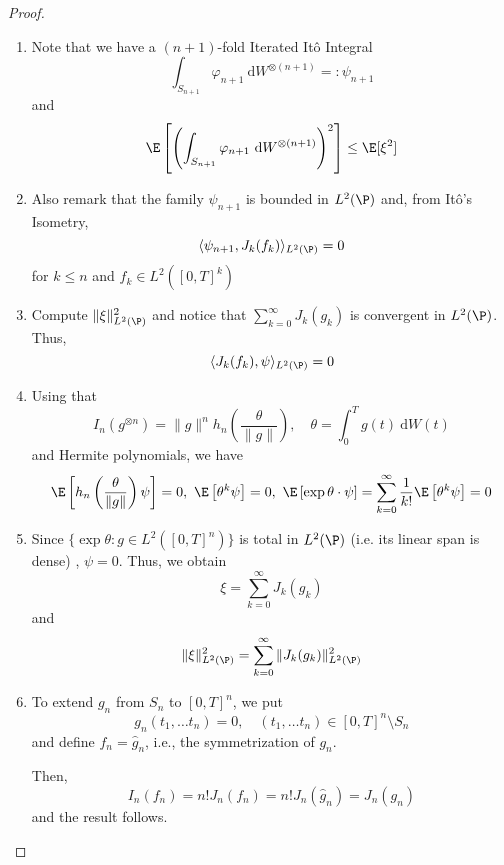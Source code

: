 \begin{proof}
\begin{enumerate}
    \item Note that we have a $(n+1)$-fold Iterated Itô Integral
        $$
        \int_{S_{n+1}} \varphi_{n+1} ~\mathrm{d}W^{\otimes(n+1)} =: \psi_{n+1}
        $$
        and 
        $$
        \E \left[ \left( \int_{S_{n+1}} \varphi_{n+1} ~\mathrm{d}W^{\otimes(n+1)} \right)^2 \right] \le \E[\xi^2]
        $$

    \item Also remark that the family $\psi_{n+1}$ is bounded in $L^2(\P)$ and, from Itô's Isometry,
        $$
        \langle \psi_{n+1}, J_k(f_k) \rangle_{L^2(\P)} = 0
        $$
        for $k \le n$ and $f_k \in L^2([0,T]^k)$

    \item Compute $\| \xi \|_{L^2(\P)}^2$ and notice that $\sum_{k=0}^\infty J_k(g_k)$ is convergent in $L^2(\P)$. Thus,
        $$
        \langle J_k(f_k), \psi \rangle_{L^2(\P)} = 0
        $$

    \item Using that
    $$
    I_n(g^{\otimes n}) = \| g \|^n h_n \left(\frac{\theta}{\| g \|} \right), \quad \theta = \int_0^T g(t) ~\mathrm{d}W(t)
    $$
    and Hermite polynomials, we have
    $$
        \E \left[ h_n \left(\frac{\theta}{\| g \|} \right) \psi \right] = 0, \  
        \E \left[ \theta^k \psi \right] = 0, \  \E \left[ \exp \theta \cdot \psi \right] = \sum_{k=0}^\infty \frac{1}{k!} \E \left[ \theta^k \psi \right] = 0
    $$

    \item Since $\{ \exp \theta : g \in L^2([0,T]^n) \}$ is total in $L^2(\P)$ (i.e. its linear span is dense) \cite[Lemma 4.3.2]{oksendal2013stochastic}, $\psi = 0$. Thus, we obtain 
        $$
        \xi = \sum_{k=0}^\infty J_k(g_k)
        $$
        and
        $$
        \| \xi \|_{L^2(\P)}^2 = \sum_{k=0}^\infty \| J_k(g_k) \|_{L^2(\P)}^2
        $$

    \item To extend $g_n$ from $S_n$ to $[0,T]^n$, we put 
        $$
        g_n(t_1, \ldots t_n) = 0, \quad (t_1, \ldots t_n) \in [0,T]^n \setminus S_n
        $$
        and define $f_n = \hat{g}_n$, i.e., the symmetrization of $g_n$.

        Then, 
        $$
        I_n(f_n) = n! J_n(f_n) = n! J_n(\hat{g}_n) = J_n(g_n)
        $$
        and the result follows.
\end{enumerate}
\end{proof}
